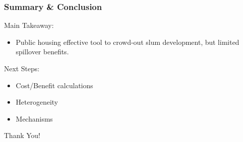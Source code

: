 \documentclass[aspectratio=32]{beamer}
\begin{document}

\begin{frame}
\frametitle{Summary \& Conclusion}

Main Takeaway:
\begin{itemize}
\item Public housing effective tool to crowd-out slum development, but limited spillover benefits.
 \end{itemize}
\vspace{2mm}
Next Steps:
  \begin{itemize}
    \item Cost/Benefit calculations 
    \item Heterogeneity 
    \item Mechanisms
  \end{itemize}

{\Large
  \begin{center}
  Thank You!
  \end{center}
}
\end{frame}

\end{document}
